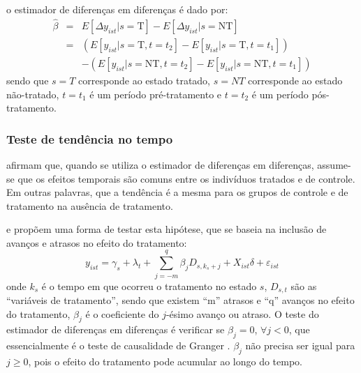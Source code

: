 \documentclass[twoside,onecolumn,12pt]{article}
\numberwithin{outputctr}{section}
\begin{document}
\noindent o estimador de diferen\c{c}as em diferen\c{c}as \'{e} dado por:
\begin{equation}
\begin{array}{rcl}
 \hat{\beta} & = & E[\Delta y_{ist} | s = \text{T}] - E[\Delta y_{ist} | s = \text{NT}] \\ 
 ~           & = & (E[y_{ist} | s = \text{T}, t = t_2] - E[y_{ist} | s = \text{T}, t = t_1]) \\
 ~           & ~ & - (E[y_{ist} | s = \text{NT}, t = t_2] - E[y_{ist} | s = \text{NT}, t = t_1])
\end{array}
\end{equation}
\noindent sendo que $s=T$ corresponde ao estado tratado, $s=NT$ corresponde ao estado n\~{a}o-tratado,
$t=t_1$ \'{e} um per\'{i}odo pr\'{e}-tratamento e $t=t_2$ \'{e} um per\'{i}odo p\'{o}s-tratamento.


\subsubsection{Teste de tend\^{e}ncia no tempo \label{secTendenciaNoTempo}}

 afirmam que,
quando se utiliza o estimador de diferen\c{c}as em diferen\c{c}as,
assume-se que os efeitos temporais s\~{a}o comuns entre os indiv\'{i}duos tratados e de controle.
Em outras palavras, que a tend\^{e}ncia \'{e} a mesma para os grupos de controle e de tratamento 
na aus\^{e}ncia de tratamento.

 e  prop\~{o}em uma forma de testar esta hip\'{o}tese,
que se baseia na inclus\~{a}o de avan\c{c}os e atrasos no efeito do tratamento:
\begin{equation}
 y_{ist} = \gamma_s + \lambda_t + \sum_{j = -m}^{q}{ \beta_{j} D_{s, k_s + j} } + X_{ist} \delta + \varepsilon_{ist}
 \label{eq_TendenciaNoTempo}
\end{equation}
\noindent onde $k_s$ \'{e} o tempo em que ocorreu o tratamento no estado $s$,
$D_{s,t}$ s\~{a}o as ``vari\'{a}veis de tratamento'', sendo que existem
``m'' atrasos e ``q'' avan\c{c}os no efeito do tratamento,
$\beta_{j}$ \'{e} o coeficiente do $j$-\'{e}simo avan\c{c}o ou atraso.
O teste do estimador de diferen\c{c}as em diferen\c{c}as \'{e} verificar se $\beta_{j} = 0$, $\forall j < 0$,
que essencialmente \'{e} o teste de causalidade de Granger \cite{bibAppliedEconometricTimeSeries2014}.
$\beta_{j}$ n\~{a}o precisa ser igual para $j \geq 0$, pois o efeito do tratamento pode acumular ao longo do tempo.
\end{document}
